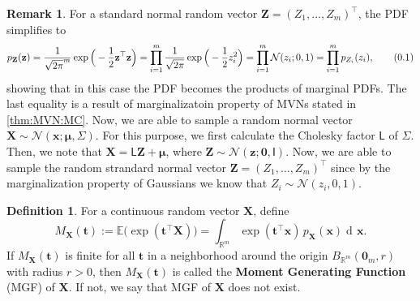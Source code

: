 \documentclass[10pt]{article}
\theoremstyle{definition}
\newtheorem{defn}{Definition}[section]
\newtheorem*{rem}{Remark}
\newcommand\eqnum{\addtocounter{equation}{1}\tag{\arabic{section}.\arabic{equation}}}
\DeclareMathOperator{\df}{d\!}
\begin{document}
\begin{rem}
For a standard normal random vector $\mathbf{Z}=(Z_1,\dots,Z_m)^{\top}$, the PDF simplifies to
\begin{align*}
p_{\mathbf{Z}}(\mathbf{z}) 
=  \frac{1}{\sqrt{2\pi}^m} \exp\Big(-\frac{1}{2}\mathbf{z}^{\top}\mathbf{z}\Big) 
= \prod_{i=1}^{m}\frac{1}{\sqrt{2\pi}}\exp\Big(-\frac{1}{2}z_i^2\Big) 
= \prod_{i=1}^{m}\mathcal{N}(z_i; 0, 1)=\prod_{i=1}^{m}p_{Z_i}(z_i),
\eqnum
\label{eq:Ran:Vec:SN:PDF}
\end{align*}
showing that in this case the PDF becomes the products of marginal PDFs. The last equality is a result of marginalizatoin property of MVNs stated in \cref{thm:MVN:MC}. Now, we are able to sample a random normal vector $\mathbf{X}\sim\mathcal{N}(\mathbf{x}; \boldsymbol{\mu}, \mathsf{\Sigma})$. For this purpose, we first calculate the Cholesky factor $\mathsf{L}$ of $\mathsf{\Sigma}$. Then, we note that $\mathbf{X} = \mathsf{L} \mathbf{Z} + \boldsymbol{\mu}$, where $\mathbf{Z}\sim\mathcal{N}(\mathbf{z}; \mathbf{0}, \mathsf{I})$. Now, we are able to sample the random strandard normal vector $\mathbf{Z}=(Z_1,\dots,Z_m)^{\top}$ since by the marginalization property of Gaussians we know that $Z_i\sim\mathcal{N}(z_i, 0, 1)$.
\label{exmp:sample}
\end{rem}
\begin{defn}
For a continuous random vector $\mathbf{X}$, define
\begin{equation}
M_{\mathbf{X}}(\mathbf{t})  
:= \mathbb{E}\big(\exp(\mathbf{t}^\top\mathbf{X})\big)
= \int_{\mathbb{R}^m}\exp(\mathbf{t}^{\top}\mathbf{x})\,p_{\mathbf{X}}(\mathbf{x})\df\mathbf{x}.
\end{equation}
If $M_{\mathbf{X}}(\mathbf{t})$ is finite for all $\mathbf{t}$ in a neighborhood around the origin $B_{\mathbb{R}^m}(\mathbf{0}_m, r)$ with radius $r>0$, then $M_{\mathbf{X}}(\mathbf{t})$ is called the \textbf{Moment Generating Function} (MGF) of $\mathbf{X}$. If not, we say that MGF of  $\mathbf{X}$ does not exist.
\end{defn}
\end{document}
